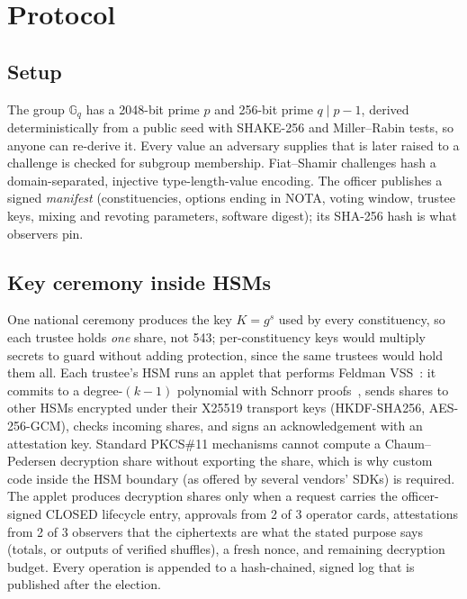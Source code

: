 \documentclass[runningheads]{llncs}
\newcommand{\G}{\mathbb{G}_q}
\begin{document}
\section{Protocol}\label{sec:protocol}

\subsection{Setup}
The group $\G$ has a 2048-bit prime $p$ and 256-bit prime $q \mid p-1$, derived deterministically from a public seed with SHAKE-256 and Miller--Rabin tests, so anyone can re-derive it. Every value an adversary supplies that is later raised to a challenge is checked for subgroup membership. Fiat--Shamir challenges hash a domain-separated, injective type-length-value encoding. The officer publishes a signed \emph{manifest} (constituencies, options ending in NOTA, voting window, trustee keys, mixing and revoting parameters, software digest); its SHA-256 hash is what observers pin.

\subsection{Key ceremony inside HSMs}
One national ceremony produces the key $K = g^s$ used by every constituency, so each trustee holds \emph{one} share, not 543; per-constituency keys would multiply secrets to guard without adding protection, since the same trustees would hold them all. Each trustee's HSM runs an applet that performs Feldman VSS~\cite{feldman1987,pedersen1991}: it commits to a degree-$(k-1)$ polynomial with Schnorr proofs~\cite{schnorr1991}, sends shares to other HSMs encrypted under their X25519 transport keys (HKDF-SHA256, AES-256-GCM), checks incoming shares, and signs an acknowledgement with an attestation key. Standard PKCS\#11 mechanisms cannot compute a Chaum--Pedersen decryption share without exporting the share, which is why custom code inside the HSM boundary (as offered by several vendors' SDKs) is required. The applet produces decryption shares only when a request carries the officer-signed \textsf{CLOSED} lifecycle entry, approvals from 2 of 3 operator cards, attestations from 2 of 3 observers that the ciphertexts are what the stated purpose says (totals, or outputs of verified shuffles), a fresh nonce, and remaining decryption budget. Every operation is appended to a hash-chained, signed log that is published after the election.
\end{document}
